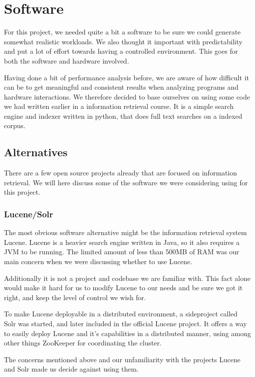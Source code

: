 \clearpage
\section{Software}
\label{sec:software}
For this project, we needed quite a bit a software to be sure we could generate somewhat realistic workloads.
We also thought it important with predictability and put a lot of effort towards having a controlled environment. This goes for both the software and hardware involved.

Having done a bit of performance analysis before, we are aware of how difficult it can be to get meaningful and consistent results when analyzing programs and hardware interactions. We therefore decided to base ourselves on using some code we had written earlier in a information retrieval course. It is a simple search engine and indexer written in python, that does full text searches on a indexed corpus.

\subsection{Alternatives}
There are a few open source projects already that are focused on information retrieval. We will here discuss some of the software we were considering using for this project.

\subsubsection{Lucene/Solr}
The most obvious software alternative might be the information retrieval system Lucene. Lucene is a heavier search engine written in Java, so it also requires a JVM to be running. The limited amount of less than 500MB of RAM was our main concern when we were discussing whether to use Lucene.

Additionally it is not a project and codebase we are familiar with.
This fact alone would make it hard for us to modify Lucene to our needs and be sure we got it right, and keep the level of control we wish for.

To make Lucene deployable in a distributed environment, a sideproject called Solr was started, and later included in the official Lucene project. 
It offers a way to easily deploy Lucene and it's capabilities in a distributed manner, using among other things ZooKeeper for coordinating the cluster.

The concerns mentioned above and our unfamiliarity with the projects Lucene and Solr made us decide against using them.

